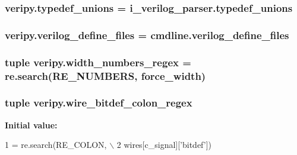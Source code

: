 \hypertarget{namespaceveripy_a20ec0a39494208c8aad3119964661091}{
\subsubsection[{typedef\-\_\-unions}]{\setlength{\rightskip}{0pt plus 5cm}veripy.\-typedef\-\_\-unions = i\-\_\-verilog\-\_\-parser.\-typedef\-\_\-unions}}\label{namespaceveripy_a20ec0a39494208c8aad3119964661091}
\hypertarget{namespaceveripy_aaa42df7d9bf399b8f41b39fd8e0d35ea}{
\subsubsection[{verilog\-\_\-define\-\_\-files}]{\setlength{\rightskip}{0pt plus 5cm}veripy.\-verilog\-\_\-define\-\_\-files = cmdline.\-verilog\-\_\-define\-\_\-files}}\label{namespaceveripy_aaa42df7d9bf399b8f41b39fd8e0d35ea}
\hypertarget{namespaceveripy_af5cff4136cdf82435499ac37785ac957}{
\subsubsection[{width\-\_\-numbers\-\_\-regex}]{\setlength{\rightskip}{0pt plus 5cm}tuple veripy.\-width\-\_\-numbers\-\_\-regex = re.\-search(R\-E\-\_\-\-N\-U\-M\-B\-E\-R\-S, {\bf force\-\_\-width})}}\label{namespaceveripy_af5cff4136cdf82435499ac37785ac957}
\hypertarget{namespaceveripy_aa33d8fd3035f8d40742a86cdcabd1507}{
\subsubsection[{wire\-\_\-bitdef\-\_\-colon\-\_\-regex}]{\setlength{\rightskip}{0pt plus 5cm}tuple veripy.\-wire\-\_\-bitdef\-\_\-colon\-\_\-regex}}\label{namespaceveripy_aa33d8fd3035f8d40742a86cdcabd1507}
{\bfseries Initial value\-:}
\begin{DoxyCode}
1 = re.search(RE\_COLON, \(\backslash\)
2                                               wires[c\_signal][\textcolor{stringliteral}{'bitdef'}])
\end{DoxyCode}

